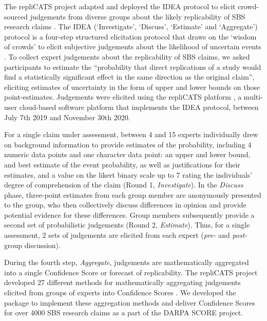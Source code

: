 \documentclass[article]{jss}
\begin{document}
The repliCATS project adapted and deployed the IDEA protocol to elicit
crowd-sourced judgements from diverse groups about the likely
replicability of SBS research claims \citep{Fraser:2021}. The IDEA
(`Investigate', `Discuss', `Estimate' and `Aggregate') protocol is a
four-step structured elicitation protocol that draws on the `wisdom of
crowds' to elicit subjective judgements about the likelihood of
uncertain events \citep[figure 1]{hemming2017}. To collect expert
judgements about the replicability of SBS claims, we asked participants
to estimate the ``probability that direct replications of a study would
find a statistically significant effect in the same direction as the
original claim'', eliciting estimates of uncertainty in the form of
upper and lower bounds on those point-estimates. Judgements were
elicited using the repliCATS platform \citep{Pearson2021}, a multi-user
cloud-based software platform that implements the IDEA protocol, between
July 7th 2019 and November 30th 2020.

For a single claim under assessment, between 4 and 15 experts
individually drew on background information to provide estimates of the
probability, including 4 numeric data points and one character data
point: an upper and lower bound, and best estimate of the event
probability, as well as justifications for their estimates, and a value
on the likert binary scale up to 7 rating the individuals' degree of
comprehension of the claim (Round 1, \emph{Investigate}). In the
\emph{Discuss} phase, three-point estimates from each group member are
anonymously presented to the group, who then collectively discuss
differences in opinion and provide potential evidence for these
differences. Group members subsequently provide a second set of
probabilistic judgements (Round 2, \emph{Estimate}). Thus, for a single
assessment, 2 sets of judgements are elicited from each expert
(\emph{pre-} and \emph{post-}group discussion).

During the fourth step, \emph{Aggregate}, judgements are mathematically
aggregated into a single Confidence Score or forecast of replicability.
The repliCATS project developed 27 different methods for mathematically
aggregating judgements elicited from groups of experts into Confidence
Scores \citep{Hanea2021}. We developed the  package to
implement these aggregation methods and deliver Confidence Scores for
over 4000 SBS research claims as a part of the DARPA SCORE project.
\end{document}
